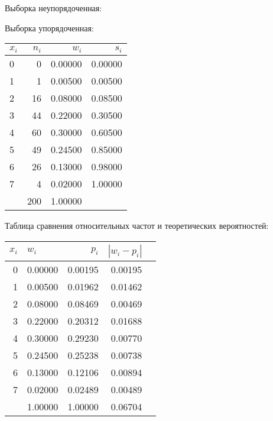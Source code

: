 Выборка неупорядоченная:\newline

\newpage
Выборка упорядоченная:\newline

\newpage


\begin{center}
\begin{tabular}{| l | r | r | r |}
\hline
$x_i$ & $n_i$ & $w_i$ & $s_i$ \\\hline
0 & 0 & 0.00000 & 0.00000 \\\hline
1 & 1 & 0.00500 & 0.00500 \\\hline
2 & 16 & 0.08000 & 0.08500 \\\hline
3 & 44 & 0.22000 & 0.30500 \\\hline
4 & 60 & 0.30000 & 0.60500 \\\hline
5 & 49 & 0.24500 & 0.85000 \\\hline
6 & 26 & 0.13000 & 0.98000 \\\hline
7 & 4 & 0.02000 & 1.00000 \\\hline
  & 200 & 1.00000 &   \\\hline
\end{tabular}
\end{center}

\newline

\newline
Таблица сравнения относительных частот и теоретических вероятностей:\newline
\begin{center}
\begin{tabular}{| r | l | r | r | r |}
\hline
$x_i$ & $w_i$ & $p_i$ & $|w_i-p_i|$ \\\hline
0 & 0.00000 & 0.00195 & 0.00195 \\\hline
1 & 0.00500 & 0.01962 & 0.01462 \\\hline
2 & 0.08000 & 0.08469 & 0.00469 \\\hline
3 & 0.22000 & 0.20312 & 0.01688 \\\hline
4 & 0.30000 & 0.29230 & 0.00770 \\\hline
5 & 0.24500 & 0.25238 & 0.00738 \\\hline
6 & 0.13000 & 0.12106 & 0.00894 \\\hline
7 & 0.02000 & 0.02489 & 0.00489 \\\hline
  & 1.00000 & 1.00000 & 0.06704 \\\hline
\end{tabular}
\end{center}
